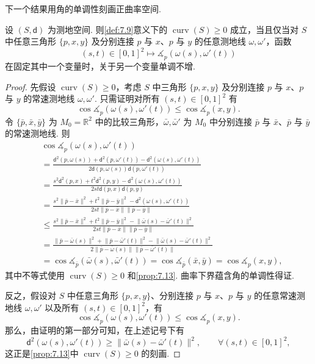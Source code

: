 下一个结果用角的单调性刻画正曲率空间.
\begin{proposition}[角的单调性]\label{prop:7.17}
设 $(S,\mathsf d)$ 为测地空间. 则\autoref{def:7.9}意义下的 $\operatorname{curv}(S)\ge0$ 成立，当且仅当对 $S$ 中任意三角形 $\{p,x,y\}$ 及分别连接 $p$ 与 $x$、$p$ 与 $y$ 的任意测地线 $\omega,\omega'$，函数
$$(s,t)\in[0,1]^2\mapsto\measuredangle_p(\omega(s),\omega'(t))$$
在固定其中一个变量时，关于另一个变量单调不增.
\end{proposition}
\begin{proof}
先假设 $\operatorname{curv}(S)\ge0$，考虑 $S$ 中三角形 $\{p,x,y\}$ 及分别连接 $p$ 与 $x$、$p$ 与 $y$ 的常速测地线 $\omega,\omega'$. 只需证明对所有 $(s,t)\in[0,1]^2$ 有
$$\cos\measuredangle_p(\omega(s),\omega'(t))\le\cos\measuredangle_p(x,y).$$
令 $\{\bar p,\bar x,\bar y\}$ 为 $M_0=\mathbb R^2$ 中的比较三角形，$\bar\omega,\bar\omega'$ 为 $M_0$ 中分别连接 $\bar p$ 与 $\bar x$、$\bar p$ 与 $\bar y$ 的常速测地线. 则
$$\begin{aligned}
&\cos\measuredangle_p(\omega(s),\omega'(t))\\
&=\frac{\mathsf d^2(p,\omega(s))+\mathsf d^2(p,\omega'(t))-\mathsf d^2(\omega(s),\omega'(t))}{2\mathsf d(p,\omega(s))\mathsf d(p,\omega'(t))}\\
&=\frac{s^2\mathsf d^2(p,x)+t^2\mathsf d^2(p,y)-\mathsf d^2(\omega(s),\omega'(t))}{2st\mathsf d(p,x)\mathsf d(p,y)}\\
&=\frac{s^2\lVert\bar p-\bar x\rVert^2+t^2\lVert\bar p-\bar y\rVert^2-\mathsf d^2(\omega(s),\omega'(t))}{2st\lVert\bar p-\bar x\rVert\lVert\bar p-\bar y\rVert}\\
&\le\frac{s^2\lVert\bar p-\bar x\rVert^2+t^2\lVert\bar p-\bar y\rVert^2-\lVert\bar\omega(s)-\bar\omega'(t)\rVert^2}{2st\lVert\bar p-\bar x\rVert\lVert\bar p-\bar y\rVert}\\
&=\frac{\lVert\bar p-\bar\omega(s)\rVert^2+\lVert\bar p-\bar\omega'(t)\rVert^2-\lVert\bar\omega(s)-\bar\omega'(t)\rVert^2}{2\lVert\bar p-\bar\omega(s)\rVert\lVert\bar p-\bar\omega'(t)\rVert}\\
&=\cos\measuredangle_{\bar p}(\bar\omega(s),\bar\omega'(t))
=\cos\measuredangle_{\bar p}(\bar x,\bar y)=\cos\measuredangle_p(x,y),
\end{aligned}$$
其中不等式使用 $\operatorname{curv}(S)\ge0$ 和\autoref{prop:7.13}. 曲率下界蕴含角的单调性得证.

反之，假设对 $S$ 中任意三角形 $\{p,x,y\}$、分别连接 $p$ 与 $x$、$p$ 与 $y$ 的任意常速测地线 $\omega,\omega'$ 以及所有 $(s,t)\in[0,1]^2$，有
$$\cos\measuredangle_p(\omega(s),\omega'(t))\le\cos\measuredangle_p(x,y).$$
那么，由证明的第一部分可知，在上述记号下有
$$\mathsf d^2(\omega(s),\omega'(t))\ge\lVert\bar\omega(s)-\bar\omega'(t)\rVert^2,\qquad\forall(s,t)\in[0,1]^2,$$
这正是\autoref{prop:7.13}中 $\operatorname{curv}(S)\ge0$ 的刻画.
\end{proof}

